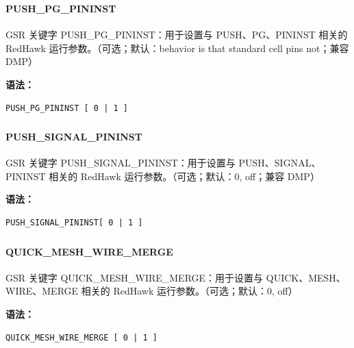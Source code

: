 \subsubsection{}
\paragraph*{PUSH_PG_PININST}

GSR 关键字 PUSH_PG_PININST：用于设置与 PUSH、PG、PININST 相关的 RedHawk 运行参数。（可选；默认：behavior is that standard cell pins not；兼容 DMP）

\textbf{语法：}
\begin{lstlisting}
PUSH_PG_PININST [ 0 | 1 ]
\end{lstlisting}

\subsubsection{}
\paragraph*{PUSH_SIGNAL_PININST}

GSR 关键字 PUSH_SIGNAL_PININST：用于设置与 PUSH、SIGNAL、PININST 相关的 RedHawk 运行参数。（可选；默认：0, off；兼容 DMP）

\textbf{语法：}
\begin{lstlisting}
PUSH_SIGNAL_PININST[ 0 | 1 ]
\end{lstlisting}

\subsubsection{}
\paragraph*{QUICK_MESH_WIRE_MERGE}

GSR 关键字 QUICK_MESH_WIRE_MERGE：用于设置与 QUICK、MESH、WIRE、MERGE 相关的 RedHawk 运行参数。（可选；默认：0, off）

\textbf{语法：}
\begin{lstlisting}
QUICK_MESH_WIRE_MERGE [ 0 | 1 ]
\end{lstlisting}

\subsubsection{}
